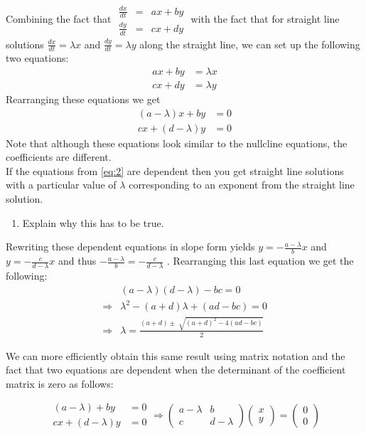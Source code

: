 Combining the fact that $ \begin{matrix} \frac{dx}{dt}&=&ax+by \\\frac{dy}{dt}&=& cx+dy  \end{matrix}$  with the fact that for straight line solutions   $\frac{dx}{dt}=\lambda x$ and $\frac{dy}{dt}=\lambda y$ along the straight line, we can set up the following two equations:  
\begin{equation}
\begin{matrix} ax+by &=\lambda x\\ cx+dy &=\lambda y \end{matrix} \tag{1}\label{eq:1}
\end{equation}
Rearranging these equations we get  
\begin{equation}
 \begin{matrix} (a-\lambda)x+by &=0\\ cx+(d-\lambda)y &=0 \end{matrix} \tag{2}\label{eq:2}
\end{equation}
Note that although these equations look similar to the nullcline equations, the coefficients are different. \\

If the equations from \eqref{eq:2} are dependent then you get straight line solutions with a particular value of $\lambda$ corresponding to an exponent from the straight line solution.
\begin{enumerate}[resume]
\item Explain why this has to be true. \label{12problem5}
\end{enumerate}
\clearpage

Rewriting these dependent equations in slope form yields  $y=-\frac{a-\lambda}{b}x$ and $y=-\frac{c}{d-\lambda}x$  
and thus $-\frac{a-\lambda}{b}=-\frac{c}{d-\lambda}$  .  Rearranging this last equation we get the following:
\begin{align*}
&(a-\lambda)(d-\lambda)-bc=0\\ 
\Rightarrow& \lambda^2-(a+d)\lambda+(ad-bc)=0\\
\Rightarrow& \lambda=\frac{(a+d)\pm \sqrt[]{(a+d)^2-4(ad-bc)}}{2}
\end{align*}
             

We can more efficiently obtain this same result using matrix notation and the fact that two equations are dependent when the determinant of the coefficient matrix is zero as follows:

\[ \begin{matrix}
(a-\lambda)+by &=0\\ cx+(d-\lambda)y &=0 \end{matrix}
\Longrightarrow \begin{pmatrix}
a-\lambda &b\\ c& d-\lambda
\end{pmatrix}\begin{pmatrix}x\\y\end{pmatrix} = \begin{pmatrix}
0\\0
\end{pmatrix}\]

